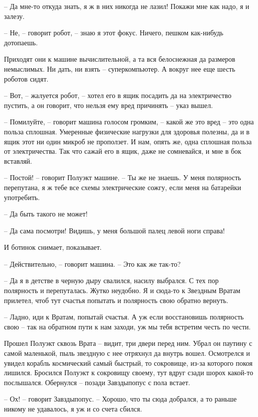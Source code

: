 \documentclass[ebook,oneside,final,openright]{memoir}
\begin{document}
– Да мне-то откуда знать, я ж в них никогда не лазил! Покажи мне как надо, я и залезу. \par
– Не, – говорит робот, – знаю я этот фокус. Ничего, пешком как-нибудь дотопаешь.\par
\par
Приходят они к машине вычислительной, а та вся белоснежная да размеров немыслимых. Ни дать, ни взять – суперкомпьютер. А вокруг нее еще шесть роботов сидят. \par
– Вот, – жалуется робот, – хотел его в ящик посадить да на электричество пустить, а он говорит, что нельзя ему вред причинять – указ вышел. \par
– Помилуйте, – говорит машина голосом громким, – какой же это вред – это одна польза сплошная. Умеренные физические нагрузки для здоровья полезны, да и в ящик этот ни один микроб не проползет. И нам, опять же, одна сплошная польза от электричества. Так что сажай его в ящик, даже не сомневайся, и мне в бок вставляй. \par
– Постой! – говорит Полуэкт машине. – Ты же не знаешь. У меня полярность перепутана, я ж тебе все схемы электрические сожгу, если меня на батарейки употребить. \par
– Да быть такого не может! \par
– Да сама посмотри! Видишь, у меня большой палец левой ноги справа! \par
И ботинок снимает, показывает. \par
– Действительно, – говорит машина. – Это как же так-то? \par
– Да я в детстве в черную дыру свалился, насилу выбрался. С тех пор полярность и перепуталась. Жутко неудобно. Я и сюда-то к Звездным Вратам прилетел, чтоб тут счастья попытать и полярность свою обратно вернуть. \par
– Ладно, иди к Вратам, попытай счастья. А уж если восстановишь полярность свою – так на обратном пути к нам заходи, уж мы тебя встретим честь по чести.\par
\par
Прошел Полуэкт сквозь Врата – видит, три двери перед ним. Убрал он паутину с самой маленькой, пыль звездную с нее отряхнул да внутрь вошел. Осмотрелся и увидел корабль космический самый быстрый, то сокровище, из-за которого покоя лишился. Бросился Полуэкт к сокровищу своему, тут вдруг сзади шорох какой-то послышался. Обернулся – позади Завздыпопус с пола встает.\par
– Ох! – говорит Завздыпопус. – Хорошо, что ты сюда добрался, а то раньше никому не удавалось, я уж и со счета сбился.\par
\end{document}
